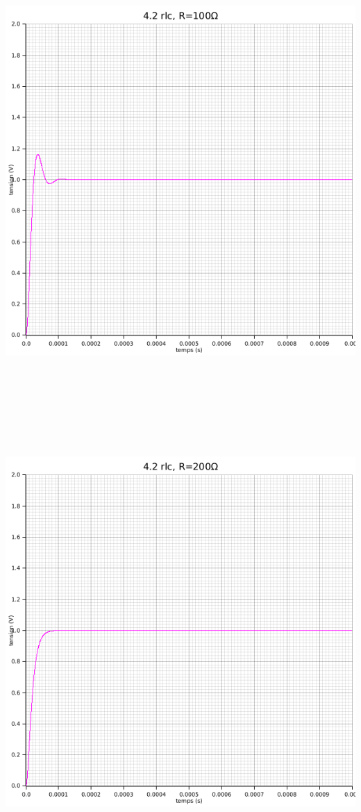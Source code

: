 \documentclass{article}
\begin{document}
{\begin{center}
    \end{center}
    \begin{center}
      \includegraphics[height=45em]{images/rlc100.png}
    \end{center}
    \begin{center}
      \includegraphics[height=45em]{images/rlc200.png}

\end{center}}
\end{document}
